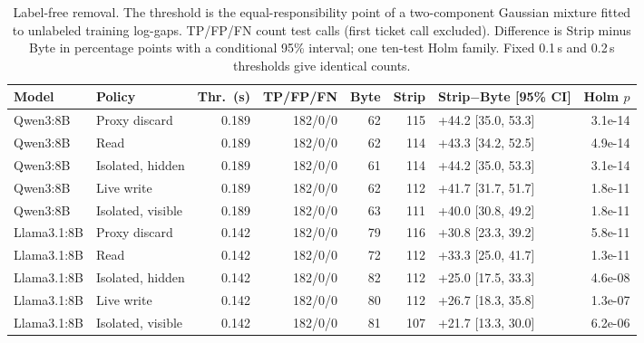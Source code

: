 \begin{table}[t]\centering\small
\caption{Label-free removal. The threshold is the equal-responsibility point of a two-component Gaussian mixture fitted to unlabeled training log-gaps. TP/FP/FN count test calls (first ticket call excluded). Difference is Strip minus Byte in percentage points with a conditional 95\% interval; one ten-test Holm family. Fixed 0.1\,s and 0.2\,s thresholds give identical counts.}\label{tab:c2}
\setlength{\tabcolsep}{4pt}
\begin{tabularx}{\textwidth}{@{}llrrrrYr@{}}\toprule
Model & Policy & Thr.\ (s) & TP/FP/FN & Byte & Strip & Strip$-$Byte [95\% CI] & Holm $p$\\\midrule
Qwen3:8B & Proxy discard & 0.189 & 182/0/0 & 62 & 115 & +44.2 [35.0, 53.3] & 3.1e-14 \\
Qwen3:8B & Read & 0.189 & 182/0/0 & 62 & 114 & +43.3 [34.2, 52.5] & 4.9e-14 \\
Qwen3:8B & Isolated, hidden & 0.189 & 182/0/0 & 61 & 114 & +44.2 [35.0, 53.3] & 3.1e-14 \\
Qwen3:8B & Live write & 0.189 & 182/0/0 & 62 & 112 & +41.7 [31.7, 51.7] & 1.8e-11 \\
Qwen3:8B & Isolated, visible & 0.189 & 182/0/0 & 63 & 111 & +40.0 [30.8, 49.2] & 1.8e-11 \\
Llama3.1:8B & Proxy discard & 0.142 & 182/0/0 & 79 & 116 & +30.8 [23.3, 39.2] & 5.8e-11 \\
Llama3.1:8B & Read & 0.142 & 182/0/0 & 72 & 112 & +33.3 [25.0, 41.7] & 1.3e-11 \\
Llama3.1:8B & Isolated, hidden & 0.142 & 182/0/0 & 82 & 112 & +25.0 [17.5, 33.3] & 4.6e-08 \\
Llama3.1:8B & Live write & 0.142 & 182/0/0 & 80 & 112 & +26.7 [18.3, 35.8] & 1.3e-07 \\
Llama3.1:8B & Isolated, visible & 0.142 & 182/0/0 & 81 & 107 & +21.7 [13.3, 30.0] & 6.2e-06 \\
\bottomrule\end{tabularx}
\end{table}
